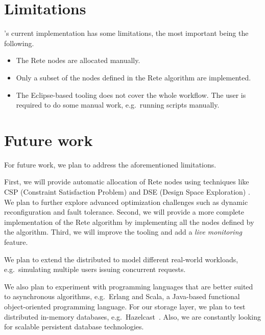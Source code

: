 \section{Limitations}

\iqd{}'s current implementation has some limitations, the most important being the following.

\begin{itemize}
  \item The Rete nodes are allocated manually.
  \item Only a subset of the nodes defined in the Rete algorithm are implemented. %
  \item The Eclipse-based tooling does not cover the whole workflow. The user is required to do some manual work, e.g.\ running scripts manually.
\end{itemize}

\section{Future work}
\label{future-work}

For future work, we plan to address the aforementioned limitations.


First, we will provide automatic allocation of Rete nodes using techniques like CSP (Constraint Satisfaction Problem) and DSE (Design Space Exploration) \cite{DSE11}. We plan to further explore advanced optimization challenges such as dynamic reconfiguration and fault tolerance. Second, we will provide a more complete implementation of the Rete algorithm by implementing all the nodes defined by the algorithm. Third, we will improve the tooling and add a \emph{live monitoring} feature.

We plan to extend the distributed \tb{} to model different real-world workloads, e.g.\ simulating multiple users issuing concurrent requests.

We also plan to experiment with programming languages that are better suited to asynchronous algorithms, e.g.\ Erlang and Scala, a Java-based functional object-oriented programming language. 
For our storage layer, we plan to test distributed in-memory databases, e.g.\ Hazelcast~\cite{Hazelcast}. Also, we are constantly looking for scalable persistent database technologies. 
